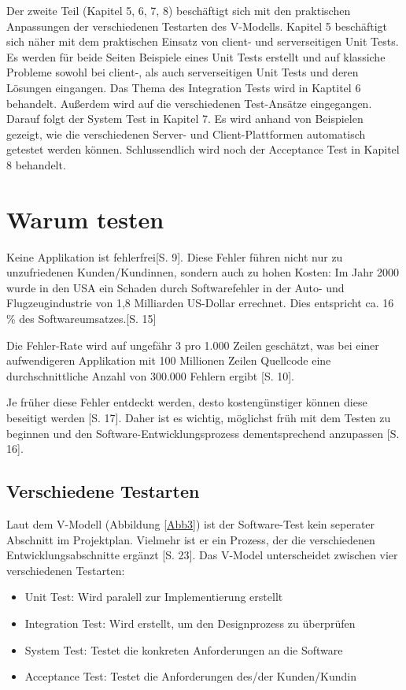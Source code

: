 \documentclass[a4paper,bibtotoc,oneside]{scrbook}
\begin{document}
Der zweite Teil (Kapitel 5, 6, 7, 8) beschäftigt sich mit den praktischen Anpassungen der verschiedenen Testarten des V-Modells. Kapitel 5 beschäftigt sich näher mit dem praktischen Einsatz von client- und serverseitigen Unit Tests. Es werden für beide Seiten Beispiele eines Unit Tests erstellt und auf klassiche Probleme sowohl bei client-, als auch serverseitigen Unit Tests und deren Lösungen eingangen. Das Thema des Integration Tests wird in Kaptitel 6 behandelt. Außerdem wird auf die verschiedenen Test-Ansätze eingegangen. Darauf folgt der System Test in Kapitel 7. Es wird anhand von Beispielen gezeigt, wie die verschiedenen Server- und Client-Plattformen automatisch getestet werden können. Schlussendlich wird noch der Acceptance Test in Kapitel 8 behandelt.

\chapter{Warum testen}
Keine Applikation ist fehlerfrei\cite{empiric_invest}[S. 9]. Diese Fehler  führen nicht nur zu unzufriedenen Kunden/Kundinnen, sondern auch zu hohen Kosten: \glqq Im Jahr 2000 wurde in den USA ein Schaden durch Softwarefehler in der Auto- und Flugzeugindustrie von 1,8 Milliarden US-Dollar errechnet. Dies entspricht ca. 16 \% des Softwareumsatzes.\grqq\cite{betrieb}[S. 15]

Die Fehler-Rate wird auf ungefähr 3 pro 1.000 Zeilen geschätzt, was bei einer aufwendigeren Applikation mit 100 Millionen Zeilen Quellcode eine durchschnittliche Anzahl von 300.000 Fehlern ergibt \cite{eval_regression}[S. 10]. 

Je früher diese Fehler entdeckt werden, desto kostengünstiger können diese beseitigt werden \cite{betrieb}[S. 17]. Daher ist es wichtig, möglichst früh mit dem Testen zu beginnen und den Software-Entwicklungsprozess dementsprechend anzupassen \cite{betrieb}[S. 16]. 

\section{Verschiedene Testarten}
Laut dem V-Modell (Abbildung \ref{Abb3}) ist der Software-Test kein seperater Abschnitt im Projektplan. Vielmehr ist er ein Prozess, der die verschiedenen Entwicklungsabschnitte ergänzt \cite{betrieb}[S. 23]. Das V-Model unterscheidet zwischen vier verschiedenen Testarten:

\begin{itemize}
	\item Unit Test: Wird paralell zur Implementierung erstellt
	\item Integration Test: Wird erstellt, um den Designprozess zu überprüfen
	\item System Test: Testet die konkreten Anforderungen an die Software
	\item Acceptance Test: Testet die Anforderungen des/der Kunden/Kundin
\end{itemize}
\end{document}
